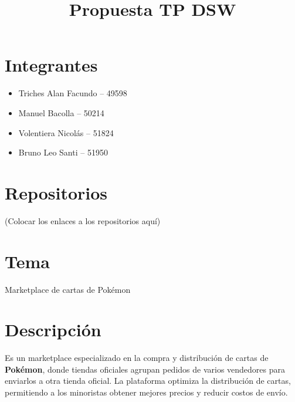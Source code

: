 \documentclass[a4paper,12pt]{article}
\title{\textbf{Propuesta TP DSW}}
\date{}
\begin{document}
\maketitle

\section*{Integrantes}
\begin{itemize}
    \item Triches Alan Facundo -- 49598
    \item Manuel Bacolla -- 50214
    \item Volentiera Nicolás -- 51824
    \item Bruno Leo Santi -- 51950
\end{itemize}

\section*{Repositorios}
(Colocar los enlaces a los repositorios aquí)

\section*{Tema}
Marketplace de cartas de Pokémon

\section*{Descripción}
Es un marketplace especializado en la compra y distribución de cartas de \textbf{Pokémon}, donde tiendas oficiales agrupan pedidos de varios vendedores para enviarlos a otra tienda oficial. La plataforma optimiza la distribución de cartas, permitiendo a los minoristas obtener mejores precios y reducir costos de envío.
\end{document}
